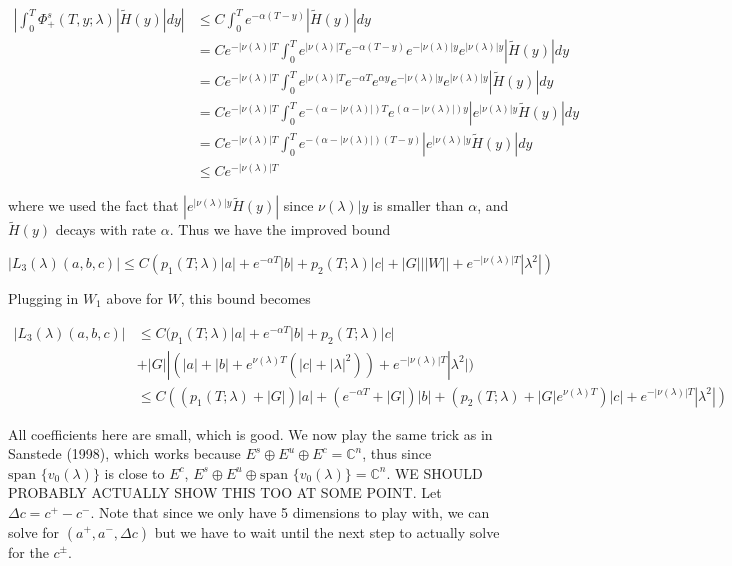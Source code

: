 \documentclass[12pt]{article}
\def\C{{\mathbb C}}
\begin{document}
\begin{enumerate}
\begin{align*}
\left| \int_0^T \Phi^s_+(T, y; \lambda) |\tilde{H}(y)| dy \right| 
&\leq C \int_0^T e^{-\alpha (T - y)}|\tilde{H}(y)| dy \\
&= C e^{-|\nu(\lambda)|T} \int_0^T e^{|\nu(\lambda)|T} e^{-\alpha (T - y)} e^{-|\nu(\lambda)|y} e^{|\nu(\lambda)|y}|\tilde{H}(y)| dy \\
&= C e^{-|\nu(\lambda)|T} \int_0^T e^{|\nu(\lambda)|T} e^{-\alpha T} e^{\alpha y} e^{-|\nu(\lambda)|y} e^{|\nu(\lambda)|y}|\tilde{H}(y)| dy \\
&= C e^{-|\nu(\lambda)|T} \int_0^T e^{-(\alpha - |\nu(\lambda)|)T} e^{(\alpha -|\nu(\lambda)|)y} | e^{|\nu(\lambda)|y} \tilde{H}(y)| dy \\
&= C e^{-|\nu(\lambda)|T} \int_0^T e^{-(\alpha - |\nu(\lambda)|)(T - y)}| e^{|\nu(\lambda)|y} \tilde{H}(y)| dy \\
&\leq C e^{-|\nu(\lambda)|T}
\end{align*}

where we used the fact that $|e^{|\nu(\lambda)|y} \tilde{H}(y)|$ since $\nu(\lambda)|y$ is smaller than $\alpha$, and $\tilde{H}(y)$ decays with rate $\alpha$. Thus we have the improved bound

\[
|L_3(\lambda)(a, b, c)| \leq C ( p_1(T; \lambda)|a|
+ e^{-\alpha T}|b| + p_2(T; \lambda)|c| + |G|||W|| + e^{-|\nu(\lambda)|T} |\lambda^2| )
\]

Plugging in $W_1$ above for $W$, this bound becomes


\begin{align*}
|L_3(\lambda)(a, b, c)| &\leq C ( p_1(T; \lambda)|a|
+ e^{-\alpha T}|b| + p_2(T; \lambda)|c| \\
&+ |G||(|a| + |b| + e^{\nu(\lambda)T}(|c| + |\lambda|^2)) + e^{-|\nu(\lambda)|T} |\lambda^2| ) \\
&\leq C ( (p_1(T; \lambda) + |G|)|a| + (e^{-\alpha T} + |G|)|b| + ( p_2(T; \lambda) + |G|e^{\nu(\lambda)T})|c| + e^{-|\nu(\lambda)|T} |\lambda^2| ) 
\end{align*}

All coefficients here are small, which is good. We now play the same trick as in Sanstede (1998), which works because $E^s \oplus E^u \oplus E^c = \C^n$, thus since $\text{span }\{v_0(\lambda)\}$ is close to $E^c$, $E^s \oplus E^u \oplus \text{span }\{v_0(\lambda)\} = \C^n$. WE SHOULD PROBABLY ACTUALLY SHOW THIS TOO AT SOME POINT. Let $\Delta c = c^+ - c^-$. Note that since we only have 5 dimensions to play with, we can solve for $(a^+, a^-, \Delta c)$ but we have to wait until the next step to actually solve for the $c^\pm$.\\


\end{enumerate}
\end{document}
